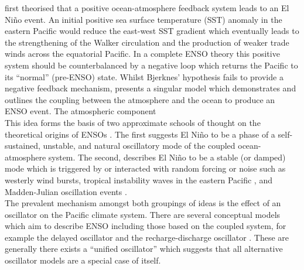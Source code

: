 \documentclass[12pt, onecolumn]{revtex4}    %
\begin{document}

\cite{doi:10.1175/1520-04931969097} first theorised that a positive ocean-atmosphere feedback system leads to an El Ni\~{n}o event. An initial positive sea surface temperature (SST) anomaly in the eastern Pacific would reduce the east-west SST gradient which eventually leads to the strengthening of the Walker circulation and the production of weaker trade winds across the equatorial Pacific. In a complete ENSO theory this positive system should be counterbalanced by a negative loop which returns the Pacific to its ``normal'' (pre-ENSO) state. Whilst Bjerknes' hypothesis fails to provide a negative feedback mechanism, \cite{Zebiak:1987aa} presents a singular model which demonstrates and outlines the coupling between the atmosphere and the ocean to produce an ENSO event. The atmospheric component  \\

This idea forms the basis of two approximate schools of thought on the theoretical origins of ENSOs \citep{wang2017nino}. The first suggests El Ni\~{n}o to be a phase of a self-sustained, unstable, and natural oscillatory mode of the coupled ocean-atmosphere system. The second, describes El Ni\~{n}o to be a stable (or damped) mode which is triggered by or interacted with random forcing or noise such as westerly wind bursts, tropical instability waves in the eastern Pacific \citep{An:2008aa}, and Madden-Julian oscillation events \citep{doi:10.1175/JAS4029.1}.  \\

The prevalent mechanism amongst both groupings of ideas is the effect of an oscillator on the Pacific climate system. There are several conceptual models which aim to describe ENSO including those based on the coupled system, for example the delayed oscillator \citep{Suarez:1988aa, Battisti:1988aa} and the recharge-discharge oscillator \citep{Jin:1997aa}. These are generally there exists a ``unified oscillator'' \citep{Wang:2001aa} which suggests that all alternative oscillator models are a special case of itself. \\



\newpage

\nocite{ruddiman_climate}


\end{document}
